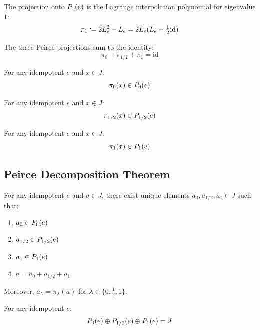 \begin{definition}[peirceProj$_1$]
The projection onto $\Peirce{e}{1}$ is the Lagrange interpolation polynomial for eigenvalue $1$:
\[ \pi_1 \defas 2\Lop{e}^2 - \Lop{e} = 2\Lop{e}(\Lop{e} - \tfrac{1}{2}\mathrm{id}) \]
\end{definition}

\begin{theorem}
The three Peirce projections sum to the identity:
\[ \pi_0 + \pi_{1/2} + \pi_1 = \mathrm{id} \]
\end{theorem}

\begin{theorem}
For any idempotent $e$ and $x \in J$:
\[ \pi_0(x) \in \Peirce{e}{0} \]
\end{theorem}

\begin{theorem}
For any idempotent $e$ and $x \in J$:
\[ \pi_{1/2}(x) \in \Peirce{e}{1/2} \]
\end{theorem}

\begin{theorem}
For any idempotent $e$ and $x \in J$:
\[ \pi_1(x) \in \Peirce{e}{1} \]
\end{theorem}

\subsection{Peirce Decomposition Theorem}

\begin{theorem}
For any idempotent $e$ and $a \in J$, there exist unique elements $a_0, a_{1/2}, a_1 \in J$ such that:
\begin{enumerate}
  \item $a_0 \in \Peirce{e}{0}$
  \item $a_{1/2} \in \Peirce{e}{1/2}$
  \item $a_1 \in \Peirce{e}{1}$
  \item $a = a_0 + a_{1/2} + a_1$
\end{enumerate}
Moreover, $a_\lambda = \pi_\lambda(a)$ for $\lambda \in \{0, \frac{1}{2}, 1\}$.
\end{theorem}

\begin{theorem}
For any idempotent $e$:
\[ \Peirce{e}{0} \oplus \Peirce{e}{1/2} \oplus \Peirce{e}{1} = J \]
\end{theorem}

